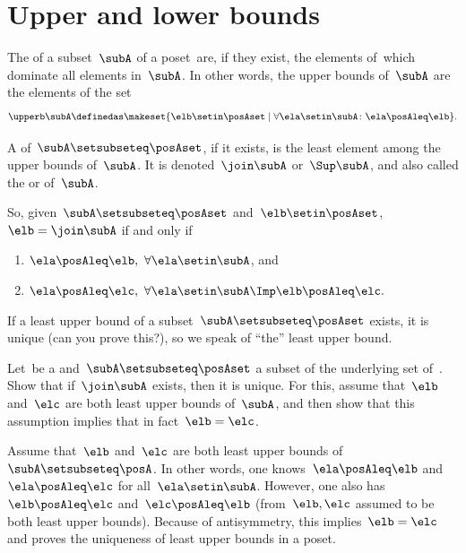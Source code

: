 
\section{Upper and lower bounds}
\begin{ctdefinition}
    \label{def:least-upper-bound}
    \label{def:upper-bounds}
    The  of a subset~$\subA$ of a poset~\posA are, if they exist, the elements of~\posA which dominate all elements in~$\subA$.
    In other words, the upper bounds of~$\subA$ are the elements of the set
    \begin{equation}
        \upperb \subA\definedas \makeset{ \elb \setin \posAset \mid \forall \ela \setin \subA \colon \ela \posAleq \elb }.
    \end{equation}
\end{ctdefinition}

\begin{ctdefinition}\label{def:supremum}
    A  of~$\subA \setsubseteq \posAset$, if it exists, is the least element among the upper bounds of~$\subA$.
    It is denoted~$\join \subA$ or~$\Sup\subA$, and also called the  or  of~$\subA$.
\end{ctdefinition}

So, given~$\subA \setsubseteq \posAset$ and~$\elb \setin \posAset$,~$\elb = \join \subA$ if and only if
\begin{enumerate}
    \item $\ela \posAleq \elb, \ \forall \ela \setin \subA$, and
    \item $\ela \posAleq \elc, \ \forall \ela \setin \subA \Imp \elb \posAleq \elc.
          $
\end{enumerate}

If a least upper bound of a subset~$\subA \setsubseteq \posAset$ exists, it is unique (can you prove this?), so we speak of ``the'' least upper bound.

\begin{exercise}
    Let~\posA be a  and~$\subA \setsubseteq \posAset$ a subset of the underlying set of~\posA.
    Show that if~$\join \subA$ exists, then it is unique.
    For this, assume that~$\elb$ and~$\elc$ are both least upper bounds of~$\subA$, and then show that this assumption implies that in fact~$\elb = \elc$.
\end{exercise}
\begin{solution}
    Assume that~$\elb$ and~$\elc$ are both least upper bounds of~$\subA \setsubseteq \posA$.
    In other words, one knows~$\ela \posAleq \elb$ and~$\ela\posAleq \elc$ for all~$\ela\setin \subA$.
    However, one also has~$\elb\posAleq \elc$ and~$\elc\posAleq \elb$ (from~$\elb,\elc$ assumed to be both least upper bounds).
    Because of antisymmetry, this implies~$\elb=\elc$ and proves the uniqueness of least upper bounds in a poset.
\end{solution}

